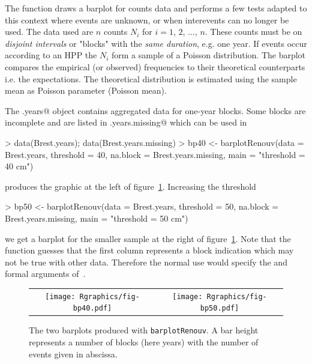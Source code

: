 \documentclass[a4paper]{report}
\begin{document}
The \verb@barplotRenouv@ function draws a barplot for counts data and
performs a few tests adapted to this context where events are unknown,
or when interevents can no longer be used.  The data used are $n$ counts $N_i$
for $i=1$, $2$, $\dots$, $n$. These counts must be on \textit{disjoint
  intervals} or "blocks" 
%
with the \textit{same duration}, e.g.  one year. If events occur
according to an HPP the $N_i$ form a sample of a Poisson
distribution. The barplot compares the empirical (or observed)
frequencies to their theoretical counterparts i.e. the
expectations. The theoretical distribution is estimated using the
sample mean as Poisson parameter (Poisson mean).

The \verb@Brest.years@ object contains aggregated data for one-year blocks. 
Some blocks are incomplete and are listed in \verb@Brest.years.missing@
which can be used in \verb@barplotRenvouv@
\begin{Schunk}
\begin{Sinput}
> data(Brest.years); data(Brest.years.missing)
> bp40 <- barplotRenouv(data = Brest.years, threshold = 40,
             na.block = Brest.years.missing, main = "threshold = 40 cm")
\end{Sinput}
\end{Schunk}
produces the graphic at the left of figure~\ref{BPS}. Increasing the threshold
\begin{Schunk}
\begin{Sinput}
> bp50 <- barplotRenouv(data = Brest.years, threshold = 50,
             na.block = Brest.years.missing, main = "threshold = 50 cm")
\end{Sinput}
\end{Schunk}
we get a barplot for the smaller sample at the right of
figure~\ref{BPS}.  Note that the function guesses that the first
column represents a block indication which may not be true with other
data. Therefore the normal use would specify the \verb@blockname@ and
\verb@varname@ formal arguments of~\verb@barplotRenouv@.

\begin{figure}
  \centering
  \begin{tabular}{c c} 
     \texttt{[image: Rgraphics/fig-bp40.pdf]} &
     \texttt{[image: Rgraphics/fig-bp50.pdf]} 
\end{tabular}
\caption{\label{BPS}The two barplots produced with
  \texttt{barplotRenouv}. A bar height represents a number of blocks
  (here years) with the number of events given in abscissa.}
\end{figure}
\end{document}
